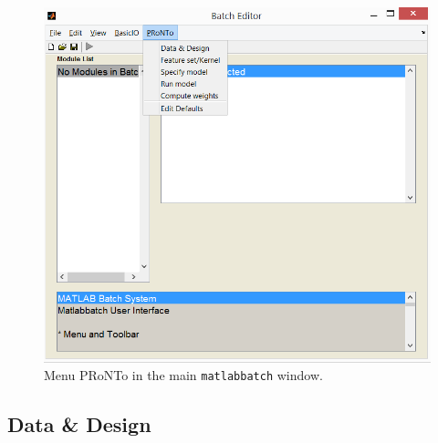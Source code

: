 \begin{figure}[h!]
	\centering
		\includegraphics[scale=0.6]{images/Tutorial/classification/batch.png}
	\caption{Menu PRoNTo in the main {\tt matlabbatch} window.}
	\label{fig:batch}
\end{figure}


\subsection{Data \& Design}

